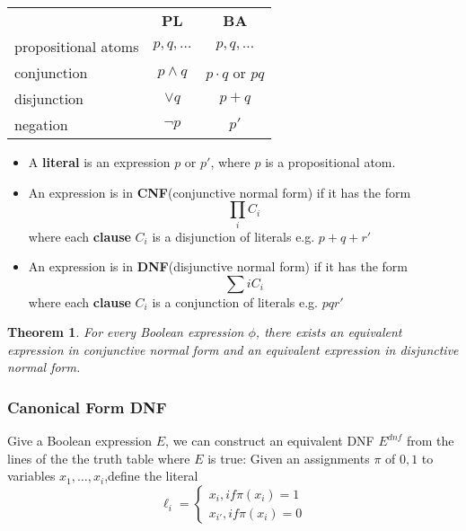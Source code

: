 \documentclass{ctexart}
\newtheorem{theorem}{\indent Theorem}[section]
\begin{document}
\begin{table}
    \centering
    \begin{tabular}{lcc}
        \hline
        & \textbf{PL} & \textbf{BA} \\
        propositional atoms & $p,q,\ldots$ & $p,q,\ldots$ \\
        conjunction & $p\land q$ & $p \cdot q$ or $pq$ \\ 
        disjunction & $ \lor q$ & $ p + q $ \\
        negation    & $\lnot p$ & $p'$ \\
        \hline
    \end{tabular}
\end{table}

\begin{itemize}
    \item A \textbf{literal} is an expression $p$ or $p'$, where $p$ is a propositional atom.
    \item  An expression is in \textbf{CNF}(conjunctive normal form) if it has the form
    \[
        \prod_{i} C_i
    \]
    where each \textbf{clause} $C_i$ is a disjunction of literals e.g. $p+q+r'$
    \item An expression is in \textbf{DNF}(disjunctive normal form) if it has the form
    \[
        \sum{i} C_i
    \]
    where each \textbf{clause} $C_i$ is a conjunction of literals e.g. $pqr'$
\end{itemize}

\begin{theorem}
    For every Boolean expression $\phi$, there exists an equivalent expression in conjunctive normal form and an equivalent expression in disjunctive normal form.
\end{theorem}

\subsubsection{Canonical Form DNF}

Give a Boolean expression $E$, we can construct an equivalent DNF $E^{dnf}$ from the lines of the the truth table where $E$ is true:
Given an assignments $\pi$ of $0,1$ to variables $x_1, \ldots, x_i$,define the literal
\begin{equation}
        \ell_i = \begin{cases}
            x_{i},  if \pi(x_i) = 1 \\
            x_{i'},  if \pi(x_i) = 0
        \end{cases}
\end{equation}
\end{document}
